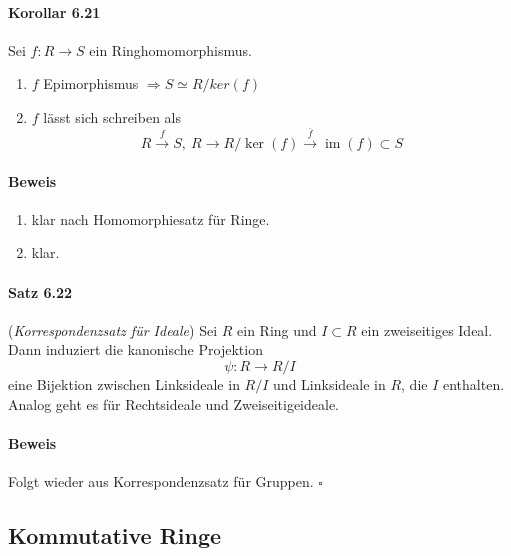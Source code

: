 \documentclass{scrartcl}
\newcommand{\im}{\operatorname{im}}
\begin{document}
\paragraph{Korollar 6.21}
Sei $f: R \to S$ ein Ringhomomorphismus.
\begin{enumerate}
\item $f$ Epimorphismus $\Rightarrow S \simeq R/ker(f)$
\item $f$ lässt sich schreiben als
  \[
    R \overset{f}{\to} S, ~ R \to R/\ker(f) \overset{\overline{f}}{\to} \im(f)
    \subset S
  \]
\end{enumerate}
\paragraph{Beweis}
\begin{enumerate}{}
\item klar nach Homomorphiesatz für Ringe.
\item klar.
\end{enumerate}

\paragraph{Satz 6.22}
(\textit{Korrespondenzsatz für Ideale}) Sei $R$ ein Ring und $I \subset R$ ein
zweiseitiges Ideal. Dann induziert die kanonische Projektion
\[
  \psi: R \to R/I
\]
eine Bijektion zwischen Linksideale in $R/I$ und Linksideale in $R$, die $I$
enthalten. Analog geht es für Rechtsideale und Zweiseitigeideale.
\paragraph{Beweis}
Folgt wieder aus Korrespondenzsatz für Gruppen.
\hfill $\square$


\subsection{Kommutative Ringe}
\label{subsec:kommutativeringe}
\end{document}
